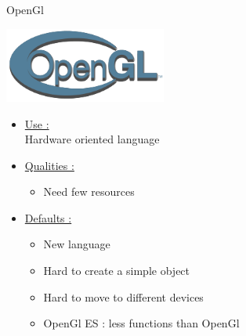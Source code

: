 \documentclass[a4paper,10pt]{beamer}
\begin{document}
			\begin{frame}{OpenGl}
				\begin{multicols}{2}
					\includegraphics[height=70pt]{images/logos/OpenGL_logo.png}\\
					
					\columnbreak 
					
					\begin{itemize}
						\item \underline{Use :}\\		
						Hardware oriented language			
						\item \underline{Qualities :}\\
						\begin{itemize}
							\item Need few resources
						\end{itemize}
					\end{itemize}		 
				\end{multicols}
				\begin{itemize}
					\item \underline{Defaults :}\\
					\begin{itemize}
						\item New language
						\item Hard to create a simple object
						\item Hard to move to different devices
						\item OpenGl ES : less functions than OpenGl
					\end{itemize}
				\end{itemize}
			\end{frame}
			
\end{document}
